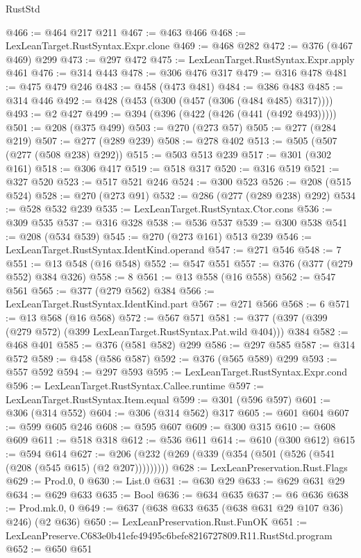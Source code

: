 \begin{lexlean}{RustStd}
\begin{coremodule}
@466 := @464 @217 @211
@467 := @463 @466
@468 := LexLeanTarget.RustSyntax.Expr.clone
@469 := @468 @282
@472 := @376 (@467 @469) @299
@473 := @297 @472
@475 := LexLeanTarget.RustSyntax.Expr.apply @461
@476 := @314 @443
@478 := @306 @476 @317
@479 := @316 @478
@481 := @475 @479 @246
@483 := @458 (@473 @481)
@484 := @386 @483
@485 := @314 @446
@492 := @428 (@453 (@300 (@457 (@306 (@484 @485) @317))))
@493 := @2 @427
@499 := @394 (@396 (@422 (@426 (@441 (@492 @493)))))
@501 := @208 (@375 @499)
@503 := @270 (@273 @57)
@505 := @277 (@284 @219)
@507 := @277 (@289 @239)
@508 := @278 @402
@513 := @505 (@507 (@277 (@508 @238) @292))
@515 := @503 @513 @239
@517 := @301 (@302 @161)
@518 := @306 @417
@519 := @518 @317
@520 := @316 @519
@521 := @327 @520
@523 := @517 @521 @246
@524 := @300 @523
@526 := @208 (@515 @524)
@528 := @270 (@273 @91)
@532 := @286 (@277 (@289 @238) @292)
@534 := @528 @532 @239
@535 := LexLeanTarget.RustSyntax.Ctor.cons
@536 := @309 @535
@537 := @316 @328
@538 := @536 @537
@539 := @300 @538
@541 := @208 (@534 @539)
@545 := @270 (@273 @161) @513 @239
@546 := LexLeanTarget.RustSyntax.IdentKind.operand
@547 := @271 @546
@548 := 7
@551 := @13 @548 (@16 @548)
@552 := @547 @551
@557 := @376 (@377 (@279 @552) @384 @326)
@558 := 8
@561 := @13 @558 (@16 @558)
@562 := @547 @561
@565 := @377 (@279 @562) @384
@566 := LexLeanTarget.RustSyntax.IdentKind.part
@567 := @271 @566
@568 := 6
@571 := @13 @568 (@16 @568)
@572 := @567 @571
@581 := @377 (@397 (@399 (@279 @572) (@399 LexLeanTarget.RustSyntax.Pat.wild @404))) @384
@582 := @468 @401
@585 := @376 (@581 @582) @299
@586 := @297 @585
@587 := @314 @572
@589 := @458 (@586 @587)
@592 := @376 (@565 @589) @299
@593 := @557 @592
@594 := @297 @593
@595 := LexLeanTarget.RustSyntax.Expr.cond
@596 := LexLeanTarget.RustSyntax.Callee.runtime
@597 := LexLeanTarget.RustSyntax.Item.equal
@599 := @301 (@596 @597)
@601 := @306 (@314 @552)
@604 := @306 (@314 @562) @317
@605 := @601 @604
@607 := @599 @605 @246
@608 := @595 @607
@609 := @300 @315
@610 := @608 @609
@611 := @518 @318
@612 := @536 @611
@614 := @610 (@300 @612)
@615 := @594 @614
@627 := @206 (@232 (@269 (@339 (@354 (@501 (@526 (@541 (@208 (@545 @615) (@2 @207)))))))))
@628 := LexLeanPreservation.Rust.Flags
@629 := Prod.{0, 0}
@630 := List.{0}
@631 := @630 @29
@633 := @629 @631 @29
@634 := @629 @633
@635 := Bool
@636 := @634 @635
@637 := @6 @636
@638 := Prod.mk.{0, 0}
@649 := @637 (@638 @633 @635 (@638 @631 @29 @107 @36) @246) (@2 @636)
@650 := LexLeanPreservation.Rust.FunOK
@651 := LexLeanPreserve.C683e0b41efe49495c6befe8216727809.R11.RustStd.program
@652 := @650 @651

\end{coremodule}
\end{lexlean}
